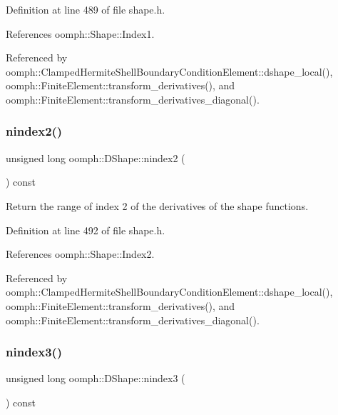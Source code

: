 Definition at line 489 of file shape.\+h.



References oomph\+::\+Shape\+::\+Index1.



Referenced by oomph\+::\+Clamped\+Hermite\+Shell\+Boundary\+Condition\+Element\+::dshape\+\_\+local(), oomph\+::\+Finite\+Element\+::transform\+\_\+derivatives(), and oomph\+::\+Finite\+Element\+::transform\+\_\+derivatives\+\_\+diagonal().

\mbox{\label{classoomph_1_1DShape_a1ce1aa1abc964aaea4b21d7de2aa559e}} 
\subsubsection{\texorpdfstring{nindex2()}{nindex2()}}
{\footnotesize\ttfamily unsigned long oomph\+::\+D\+Shape\+::nindex2 (\begin{DoxyParamCaption}{ }\end{DoxyParamCaption}) const\hspace{0.3cm}{\ttfamily [inline]}}



Return the range of index 2 of the derivatives of the shape functions. 



Definition at line 492 of file shape.\+h.



References oomph\+::\+Shape\+::\+Index2.



Referenced by oomph\+::\+Clamped\+Hermite\+Shell\+Boundary\+Condition\+Element\+::dshape\+\_\+local(), oomph\+::\+Finite\+Element\+::transform\+\_\+derivatives(), and oomph\+::\+Finite\+Element\+::transform\+\_\+derivatives\+\_\+diagonal().

\mbox{\label{classoomph_1_1DShape_a1a5a3dc7227cdf09f16484e7125df913}} 
\subsubsection{\texorpdfstring{nindex3()}{nindex3()}}
{\footnotesize\ttfamily unsigned long oomph\+::\+D\+Shape\+::nindex3 (\begin{DoxyParamCaption}{ }\end{DoxyParamCaption}) const\hspace{0.3cm}{\ttfamily [inline]}}



